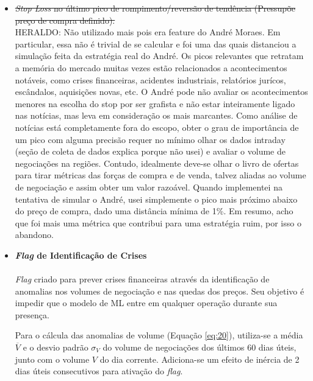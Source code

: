 \begin{itemize}
    \item \sout{\textit{Stop Loss} no último pico de rompimento/reversão de tendência (Pressupõe preço de compra definido).} \\
    \color{red} HERALDO: Não utilizado mais pois era feature do André Moraes. Em particular, essa não é trivial de se calcular e foi uma das quais distanciou a simulação feita da estratégia real do André. Os picos relevantes que retratam a memória do mercado muitas vezes estão relacionados a acontecimentos notáveis, como crises financeiras, acidentes industriais, relatórios jurícos, escândalos, aquisições novas, etc. O André pode não avaliar os acontecimentos menores na escolha do stop por ser grafista e não estar inteiramente ligado nas notícias, mas leva em consideração os mais marcantes. Como análise de notícias está completamente fora do escopo, obter o grau de importância de um pico com alguma precisão requer no mínimo olhar os dados intraday (seção de coleta de dados explica porque não usei) e avaliar o volume de negociações na regiões. Contudo, idealmente deve-se olhar o livro de ofertas para tirar métricas das forças de compra e de venda, talvez aliadas ao volume de negociação e assim obter um valor razoável. Quando implementei na tentativa de simular o André, usei simplemente o pico mais próximo abaixo do preço de compra, dado uma distância mínima de 1\%. Em resumo, acho que foi mais uma métrica que contribui para uma estratégia ruim, por isso o abandono. 

    \item \textbf{\textit{Flag} de Identificação de Crises} \\ \\
        \textit{Flag} criado para prever crises financeiras através da identificação de anomalias nos volumes de negociação e nas quedas dos preços. Seu objetivo é impedir que o modelo de ML entre em qualquer operação durante sua presença.

        Para o cálcula das anomalias de volume (Equação \ref{eq:20}), utiliza-se a média \begin{math} \overline{V} \end{math} e o desvio padrão \begin{math} \sigma_V \end{math} do volume de negociações dos últimos 60 dias úteis, junto com o volume \begin{math} V \end{math} do dia corrente. Adiciona-se um efeito de inércia de 2 dias úteis consecutivos para ativação do \textit{flag}.


\end{itemize}
